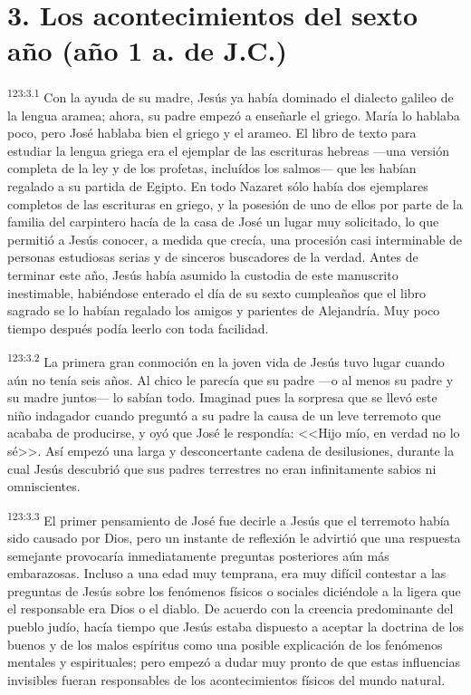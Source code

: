 \section*{3. Los acontecimientos del sexto año (año 1 a. de J.C.)}
\par 
\textsuperscript{123:3.1} Con la ayuda de su madre, Jesús ya había dominado el dialecto galileo de la lengua aramea; ahora, su padre empezó a enseñarle el griego. María lo hablaba poco, pero José hablaba bien el griego y el arameo. El libro de texto para estudiar la lengua griega era el ejemplar de las escrituras hebreas ---una versión completa de la ley y de los profetas, incluídos los salmos--- que les habían regalado a su partida de Egipto. En todo Nazaret sólo había dos ejemplares completos de las escrituras en griego, y la posesión de uno de ellos por parte de la familia del carpintero hacía de la casa de José un lugar muy solicitado, lo que permitió a Jesús conocer, a medida que crecía, una procesión casi interminable de personas estudiosas serias y de sinceros buscadores de la verdad. Antes de terminar este año, Jesús había asumido la custodia de este manuscrito inestimable, habiéndose enterado el día de su sexto cumpleaños que el libro sagrado se lo habían regalado los amigos y parientes de Alejandría. Muy poco tiempo después podía leerlo con toda facilidad.

\par 
\textsuperscript{123:3.2} La primera gran conmoción en la joven vida de Jesús tuvo lugar cuando aún no tenía seis años. Al chico le parecía que su padre ---o al menos su padre y su madre juntos--- lo sabían todo. Imaginad pues la sorpresa que se llevó este niño indagador cuando preguntó a su padre la causa de un leve terremoto que acababa de producirse, y oyó que José le respondía: <<Hijo mío, en verdad no lo sé>>. Así empezó una larga y desconcertante cadena de desilusiones, durante la cual Jesús descubrió que sus padres terrestres no eran infinitamente sabios ni omniscientes.

\par 
\textsuperscript{123:3.3} El primer pensamiento de José fue decirle a Jesús que el terremoto había sido causado por Dios, pero un instante de reflexión le advirtió que una respuesta semejante provocaría inmediatamente preguntas posteriores aún más embarazosas. Incluso a una edad muy temprana, era muy difícil contestar a las preguntas de Jesús sobre los fenómenos físicos o sociales diciéndole a la ligera que el responsable era Dios o el diablo. De acuerdo con la creencia predominante del pueblo judío, hacía tiempo que Jesús estaba dispuesto a aceptar la doctrina de los buenos y de los malos espíritus como una posible explicación de los fenómenos mentales y espirituales; pero empezó a dudar muy pronto de que estas influencias invisibles fueran responsables de los acontecimientos físicos del mundo natural.

